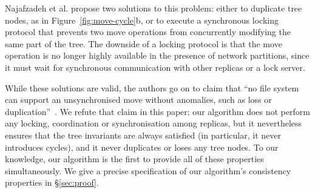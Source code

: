 \documentclass[10pt,journal,compsoc]{IEEEtran}
\begin{document}
Najafzadeh et al. propose two solutions to this problem: either to duplicate tree nodes, as in Figure~\ref{fig:move-cycle}b, or to execute a synchronous locking protocol that prevents two move operations from concurrently modifying the same part of the tree.
The downside of a locking protocol is that the move operation is no longer highly available in the presence of network partitions, since it must wait for synchronous communication with other replicas or a lock server.

While these solutions are valid, the authors go on to claim that ``no file system can support an unsynchronised move without anomalies, such as loss or duplication''~\cite{Najafzadeh:2018bw}.
We refute that claim in this paper: our algorithm does not perform any locking, coordination or synchronisation among replicas, but it nevertheless ensures that the tree invariants are always satisfied (in particular, it never introduces cycles), and it never duplicates or loses any tree nodes.
To our knowledge, our algorithm is the first to provide all of these properties simultaneously.
We give a precise specification of our algorithm's consistency properties in \S\ref{sec:proof}.
\end{document}
